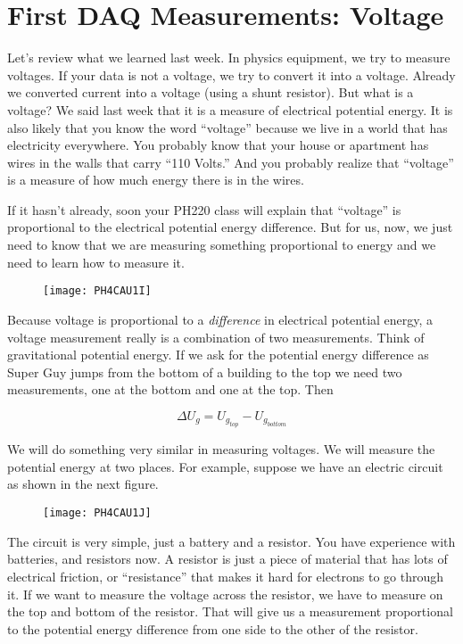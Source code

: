 \chapter{First DAQ Measurements: Voltage}
Let's review what we learned last week. In physics equipment, we try to
measure voltages. If your data is not a voltage, we try to convert it into a voltage. Already we converted current into a voltage (using a shunt resistor). But what is a voltage? We said last week that it is a measure of electrical potential energy. It is also likely that you know the word ``voltage'' because we live in a world that has electricity everywhere. You probably know that your house or apartment has wires in the walls that carry ``110 Volts.'' And you probably realize that ``voltage'' is a measure of how much energy there is in the wires.

If it hasn't already, soon your PH220 class will explain that ``voltage'' is proportional to the electrical potential energy difference. But for us, now, we just need to know that we are measuring something proportional to energy and we need to learn how to measure it.

\begin{figure}[h!]
	\centering
	\texttt{[image: PH4CAU1I]}
\end{figure}

Because voltage is proportional to a \emph{difference} in electrical potential energy, a voltage measurement really is a combination of two measurements. Think of gravitational potential energy. If we ask for the potential energy difference as Super Guy jumps from the bottom of a building to the top we need two measurements, one at the bottom and one at the top. Then 

\begin{equation*}
	\Delta U_{g}=U_{g_{top}}-U_{g_{bottom}}
\end{equation*}

We will do something very similar in measuring voltages. We will measure the potential energy at two places. For example, suppose we have an electric circuit as shown in the next figure. 

\begin{figure}[h!]
	\centering	
    \texttt{[image: PH4CAU1J]}
\end{figure}

The circuit is very simple, just a battery and a resistor. You have experience with batteries, and resistors now. A resistor is just a piece of material that has lots of electrical friction, or ``resistance'' that makes it hard for electrons to go through it. If we want to measure the voltage across the resistor, we have to measure on the top and bottom of the resistor. That will give us a measurement proportional to the potential energy difference from one side to the other of the resistor.

